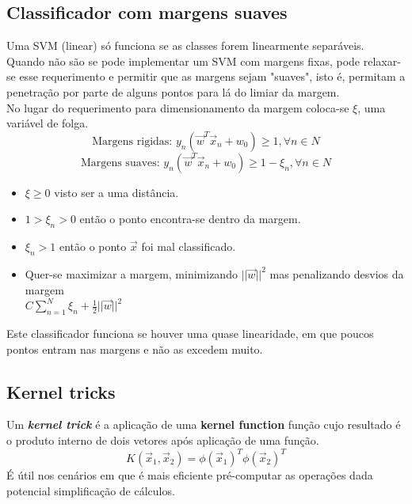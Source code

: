 \documentclass[]{report}
\begin{document}
\subsection{Classificador com margens suaves}
Uma SVM (linear) só funciona se as classes forem linearmente separáveis. Quando não são se pode implementar um SVM com margens fixas, pode relaxar-se esse requerimento e permitir que as margens sejam "suaves", isto é, permitam a penetração por parte de alguns pontos para lá do limiar da margem.\\
No lugar do requerimento para dimensionamento da margem coloca-se $\xi$, uma variável de folga.
$$\text{Margens rigidas: } y_n(\vec{w}^T \vec{x}_n + w_0) \geq 1, \forall n \in N$$
$$\text{Margens suaves: } y_n(\vec{w}^T \vec{x}_n + w_0) \geq 1 - \xi_n, \forall n \in N$$
\begin{itemize}
\item $\xi \geq 0$ visto ser a uma distância.
\item $1 > \xi_n > 0$ então o ponto encontra-se dentro da margem.
\item $\xi_n > 1$ então o ponto $\vec{x}$ foi mal classificado.
\item Quer-se maximizar a margem, minimizando $||\vec{w}||^2$ mas penalizando desvios da margem\\
$\displaystyle C \sum_{n=1}^N \xi_n + \frac{1}{2}||\vec{w}||^2$
\end{itemize}
Este classificador funciona se houver uma quase linearidade, em que poucos pontos entram nas margens e não as excedem muito.
\subsection{Kernel tricks}
Um \textit{\textbf{kernel trick}} é a aplicação de uma \textbf{kernel function} função cujo resultado é o produto interno de dois vetores após aplicação de uma função.
$$K(\vec{x}_1,\vec{x}_2) = \phi(\vec{x}_1)^T \phi(\vec{x}_2)^T$$
É útil nos cenários em que é mais eficiente pré-computar as operações dada potencial simplificação de cálculos.\\[5mm]
\end{document}
